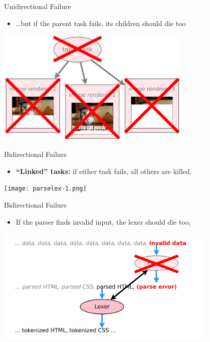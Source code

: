 \documentclass[xcolor=dvipsnames]{beamer}
\begin{document}
\begin{frame}{Unidirectional Failure}
	\begin{itemize}
		\item \dots but if the parent task fails, its children should die too
	\end{itemize}
	\begin{center}
	\includegraphics[width=0.7\textwidth]{unidirectional-3.png}
	\end{center}
\end{frame}
\begin{frame}{Bidirectional Failure}
	\begin{itemize}
		\item {\bf ``Linked'' tasks:} if either task fails, all others are killed.
	\end{itemize}
	\begin{center}
	\texttt{[image: parselex-1.png]}
	\end{center}
\end{frame}
\begin{frame}{Bidirectional Failure}
	\begin{itemize}
		\item If the parser finds invalid input, the lexer should die too,
	\end{itemize}
	\begin{center}
	\includegraphics[width=0.8\textwidth]{parselex-2.png}
	\end{center}
\end{frame}
\end{document}
